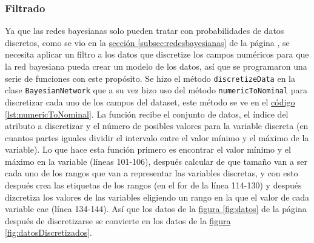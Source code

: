 \subsubsection{Filtrado}
\label{sec:filtrado}
Ya que las redes bayesianas solo pueden tratar con probabilidades de datos discretos, como se vio en la 
\hyperref[subsec:redesbayesianas]{ sección \ref{subsec:redesbayesianas}} de la página \pageref{subsec:redesbayesianas}, se necesita aplicar un filtro a los datos que discretize los campos numéricos para que la red bayesiana pueda crear un modelo de los datos, así que se programaron una serie de funciones con este propósito. Se hizo el método \texttt{discretizeData} en la clase \texttt{BayesianNetwork} que a su vez hizo uso del método \texttt{numericToNominal} para discretizar cada uno de los campos del dataset, este método se ve en el  \hyperref[lst:numericToNominal]{código \ref{lst:numericToNominal}}.
La función recibe el conjunto de datos, el índice del atributo a discretizar y el número de posibles valores para la variable discreta (en cuantos partes iguales dividir el intervalo entre el valor mínimo y el máximo de la variable).
Lo que hace esta función primero es encontrar el valor mínimo y el máximo en la variable (líneas 101-106), después calcular de que tamaño van a ser cada uno de los rangos que van a representar las variables discretas, y con esto después crea las etiquetas de los rangos (en el for de la línea 114-130) y después dizcretiza los valores de las variables eligiendo un rango en la que el valor de cada variable cae (línea 134-144).
Así que los datos de la \hyperref[fig:datos]{figura \ref{fig:datos}} de la página \pageref{fig:datos} después de discretizarse se convierte en los datos de la \hyperref[fig:datosDiscretizados]{figura \ref{fig:datosDiscretizados}}. 


